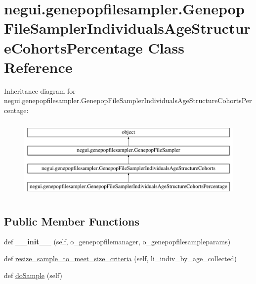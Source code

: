 \hypertarget{classnegui_1_1genepopfilesampler_1_1GenepopFileSamplerIndividualsAgeStructureCohortsPercentage}{}\section{negui.\+genepopfilesampler.\+Genepop\+File\+Sampler\+Individuals\+Age\+Structure\+Cohorts\+Percentage Class Reference}
\label{classnegui_1_1genepopfilesampler_1_1GenepopFileSamplerIndividualsAgeStructureCohortsPercentage}
Inheritance diagram for negui.\+genepopfilesampler.\+Genepop\+File\+Sampler\+Individuals\+Age\+Structure\+Cohorts\+Percentage\+:\begin{figure}[H]
\begin{center}
\leavevmode
\includegraphics[height=4.000000cm]{classnegui_1_1genepopfilesampler_1_1GenepopFileSamplerIndividualsAgeStructureCohortsPercentage}
\end{center}
\end{figure}
\subsection*{Public Member Functions}
\begin{DoxyCompactItemize}
\item 
def {\bfseries \+\_\+\+\_\+init\+\_\+\+\_\+} (self, o\+\_\+genepopfilemanager, o\+\_\+genepopfilesampleparams)\hypertarget{classnegui_1_1genepopfilesampler_1_1GenepopFileSamplerIndividualsAgeStructureCohortsPercentage_a70a4ae2ec84f02b164b34c741b09c34b}{}\label{classnegui_1_1genepopfilesampler_1_1GenepopFileSamplerIndividualsAgeStructureCohortsPercentage_a70a4ae2ec84f02b164b34c741b09c34b}

\item 
def \hyperlink{classnegui_1_1genepopfilesampler_1_1GenepopFileSamplerIndividualsAgeStructureCohortsPercentage_a84ae04a169f95a289b6aacc21db39a17}{resize\+\_\+sample\+\_\+to\+\_\+meet\+\_\+size\+\_\+criteria} (self, li\+\_\+indiv\+\_\+by\+\_\+age\+\_\+collected)
\item 
def \hyperlink{classnegui_1_1genepopfilesampler_1_1GenepopFileSamplerIndividualsAgeStructureCohortsPercentage_a295926d11ecac7194c52615902bdaf3c}{do\+Sample} (self)
\end{DoxyCompactItemize}


